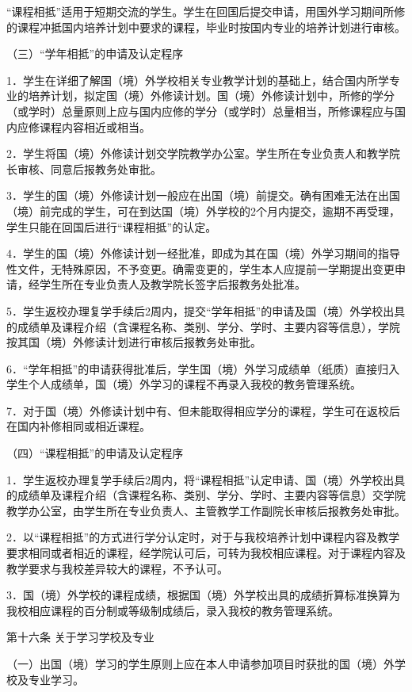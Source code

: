 \documentclass[UTF8,12pt,a4paper]{report}
\begin{document}
“课程相抵”适用于短期交流的学生。学生在回国后提交申请，用国外学习期间所修的课程冲抵国内培养计划中要求的课程，毕业时按国内专业的培养计划进行审核。

（三）“学年相抵”的申请及认定程序

1．学生在详细了解国（境）外学校相关专业教学计划的基础上，结合国内所学专业的培养计划，拟定国（境）外修读计划。国（境）外修读计划中，所修的学分（或学时）总量原则上应与国内应修的学分（或学时）总量相当，所修课程应与国内应修课程内容相近或相当。

2．学生将国（境）外修读计划交学院教学办公室。学生所在专业负责人和教学院长审核、同意后报教务处审批。

3．学生的国（境）外修读计划一般应在出国（境）前提交。确有困难无法在出国（境）前完成的学生，可在到达国（境）外学校的2个月内提交，逾期不再受理，学生只能在回国后进行“课程相抵”的认定。

4．学生的国（境）外修读计划一经批准，即成为其在国（境）外学习期间的指导性文件，无特殊原因，不予变更。确需变更的，学生本人应提前一学期提出变更申请，经学生所在专业负责人及教学院长签字后报教务处批准。

5．学生返校办理复学手续后2周内，提交“学年相抵”的申请及国（境）外学校出具的成绩单及课程介绍（含课程名称、类别、学分、学时、主要内容等信息），学院按其国（境）外修读计划进行审核后报教务处审批。

6．“学年相抵”的申请获得批准后，学生国（境）外学习成绩单（纸质）直接归入学生个人成绩单，国（境）外学习的课程不再录入我校的教务管理系统。

7．对于国（境）外修读计划中有、但未能取得相应学分的课程，学生可在返校后在国内补修相同或相近课程。

（四）“课程相抵”的申请及认定程序

1．学生返校办理复学手续后2周内，将“课程相抵”认定申请、国（境）外学校出具的成绩单及课程介绍（含课程名称、类别、学分、学时、主要内容等信息）交学院教学办公室，由学生所在专业负责人、主管教学工作副院长审核后报教务处审批。

2．以“课程相抵”的方式进行学分认定时，对于与我校培养计划中课程内容及教学要求相同或者相近的课程，经学院认可后，可转为我校相应课程。对于课程内容及教学要求与我校差异较大的课程，不予认可。

3．国（境）外学校的课程成绩，根据国（境）外学校出具的成绩折算标准换算为我校相应课程的百分制或等级制成绩后，录入我校的教务管理系统。

第十六条 关于学习学校及专业

（一）出国（境）学习的学生原则上应在本人申请参加项目时获批的国（境）外学校及专业学习。
\end{document}
